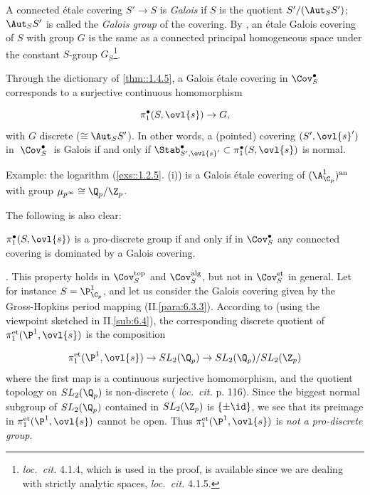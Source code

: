 \begin{para}\label{para::1.4.6} A connected \'etale covering $S'\to S$ is
 {\it Galois} if $S$ is the quotient $S'/(\Aut_S S')$; $\Aut_S S'$ is
 called the {\it Galois group} of the covering. By \cite[4.1.9]{ecfnas},
 an \'etale Galois covering of $S$ with group $G$ is the same as a
 connected principal homogeneous space under the constant 
 $S$-group $G_S$\footnote{{\it loc.~cit.}  4.1.4, which is used in the proof,
 is available since we are dealing with strictly analytic spaces, \cf
 {\it loc.~cit.} 4.1.5.}.

\noindent Through the dictionary
 of \ref{thm::1.4.5}, a Galois \'etale covering in $\Cov^{\bullet}_S$ 
 corresponds to a surjective continuous 
 homomorphism 

 \begin{equation*}
  \pi_1^\bullet(S,\ovl{s})\to G,
 \end{equation*}
 with $G$ discrete ($\cong \Aut_S S'$). In other words, a (pointed) covering
 $(S',\ovl{s}')$ in $\;\Cov^{\bullet}_S\;$ is Galois if and only if 
 ${\Stab^\bullet_{S',\ovl{s}'}}\subset
 \pi_1^\bullet(S,\ovl{s})$ is normal. 

 Example: the logarithm (\ref{exs::1.2.5}. (i)) is a Galois \'etale covering of
 $(\A^1_{\C_p})^{\mathrm{an}}$ with group $\mu_{p^\infty}\cong \Q_p/\Z_p$. 

The following is also clear:


\end{para}

\begin{cor}\label{cor::1.4.7} $\pi_1^\bullet(S,\ovl{s})$ is a
 pro-discrete group if and only if in $\Cov^\bullet_S$ any 
 connected covering is dominated by a Galois covering.
\end{cor}

\par{}. This property holds in
$\Cov^{\mathrm{top}}_S$ and $\Cov^{\mathrm{alg}}_S$, but not in
$\Cov^{\mathrm{et}}_S$ in general. Let for instance $S=\P^1_{\C_p}$, and
let us consider the Galois covering given by the 
Gross-Hopkins period mapping (II.\ref{para:6.3.3}). According to 
\cite[7.4]{efgonas} 
(using the viewpoint sketched in II.\ref{sub:6.4}), the corresponding
discrete quotient of $\pi_1^{\mathrm{et}}(\P^1,\ovl{s})$ is the composition 

\begin{equation*}
 \pi_1^{\mathrm{et}}(\P^1,\ovl{s})\to SL_2(\Q_p) \to SL_2(\Q_p)/SL_2(\Z_p)
\end{equation*}
where the first map is a continuous surjective homomorphism,
and the quotient topology on $SL_2(\Q_p)$ is non-discrete ({\it
loc.~cit.} p. 116). Since the biggest normal subgroup of $SL_2(\Q_p)$
contained in $SL_2(\Z_p)$ is $\{\pm \id\}$, we see that its preimage in
$\pi_1^{\mathrm{et}}(\P^1,\ovl{s})$ cannot be open. Thus
$\pi_1^{\mathrm{et}}(\P^1,\ovl{s})$ is {\it not a pro-discrete group}.

